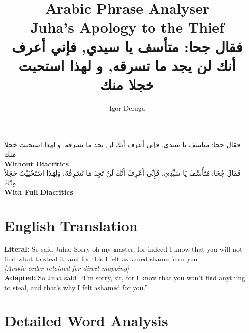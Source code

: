 \documentclass[a4paper,12pt]{article}
\begin{document}
\title{\textbf{\Large Arabic Phrase Analyser}\\
\large Juha's Apology to the Thief\\
\normalsize \textarabic{فقال جحا: متأسف يا سيدي, فإني أعرف أنك لن يجد ما تسرقه, و لهذا استحيت خجلا منك}}
\author{Igor Deruga}
\date{}
\maketitle

\begin{tcolorbox}[colback=boxcolor,colframe=headercolor,title=\textbf{Arabic Phrase},breakable]
\centering
\textarabic{فقال جحا: متأسف يا سيدي, فإني أعرف أنك لن يجد ما تسرقه, و لهذا استحيت خجلا منك}
\\[0.5em]
\textbf{Without Diacritics}
\\[1em]
\textarabic{فَقَالَ جُحَا: مُتَأَسِّفٌ يَا سَيِّدِي، فَإِنِّي أَعْرِفُ أَنَّكَ لَنْ تَجِدَ مَا تَسْرِقُهُ، وَلِهَذَا اسْتَحْيَيْتُ خَجَلاً مِنْكَ}
\\[0.5em]
\textbf{With Full Diacritics}
\end{tcolorbox}

\section{English Translation}
\begin{tcolorbox}[colback=white,colframe=accentcolor,breakable]
\textbf{Literal:} So said Juha: Sorry oh my master, for indeed I know that you will not find what to steal it, and for this I felt ashamed shame from you \\
\textit{[Arabic order retained for direct mapping]}\\[0.5em]
\textbf{Adapted:} So Juha said: ``I'm sorry, sir, for I know that you won't find anything to steal, and that's why I felt ashamed for you.''
\end{tcolorbox}

\section{Detailed Word Analysis}
\end{document}
